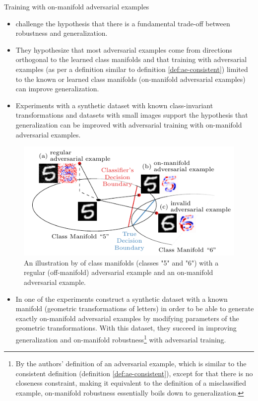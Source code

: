 \documentclass{beamer}
\newcommand{\citet}[1]{{\color{citecolor}\relscale{0.8}\textcite{#1}}}
\begin{document}
\begin{frame}[allowframebreaks=0.9]{Training with on-manifold adversarial examples}
	\begin{itemize}
		\item \citet{Stutz:2018:DARG} challenge the hypothesis that there is a fundamental trade-off between robustness and generalization. 
		
		\item They hypothesize that most adversarial examples come from directions orthogonal to the learned class manifolds and that training with adversarial examples (as per a definition similar to definition \ref{def:ae-consistent}) limited to the known or learned class manifolds (on-manifold adversarial examples) can improve generalization. 
		\item Experiments with a synthetic dataset with known class-invariant transformations and datasets with small images support the hypothesis that generalization can be improved with adversarial training with on-manifold adversarial examples.
	\end{itemize}

	\begin{figure}[htbp!]
		\begin{center}
			\includegraphics[width=\columnwidth]{figures/adversarial-examples/stutz-introduction_b.pdf}
		\end{center}
		\caption{An illustration by \citet{Stutz:2018:DARG} of class manifolds (classes "5" and "6") with a regular (off-manifold) adversarial example and an on-manifold adversarial example.}
		\label{fig:stutz-illustration}
	\end{figure}
	\begin{itemize}
		\item In one of the experiments \citet{Stutz:2018:DARG} construct a synthetic dataset with a known manifold (geometric transformations of letters) in order to be able to generate exactly on-manifold adversarial examples by modifying parameters of the geometric transformations. With this dataset, they succeed in improving generalization and on-manifold robustness\footnote[frame]{By the authors' definition of an adversarial example, which is similar to the consistent definition (definition \ref{def:ae-consistent}), except for that there is no closeness constraint, making it equivalent to the definition of a misclassified example, on-manifold robustness essentially boils down to generalization.} with adversarial training.
		

\end{itemize}
\end{frame}
\end{document}
